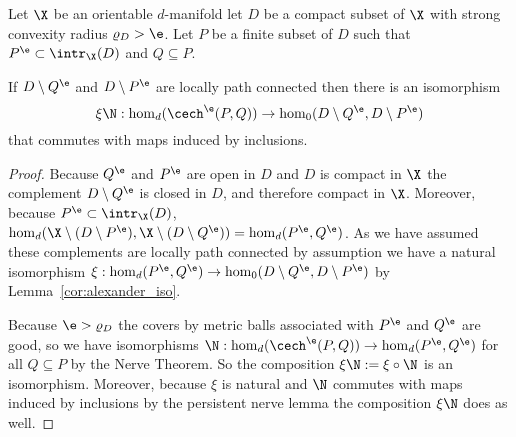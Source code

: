 \begin{lemma}\label{lem:duality_apply}
  Let $\X$ be an orientable $d$-manifold let $D$ be a compact subset of $\X$ with strong convexity radius $\varrho_D > \e$.
  Let $P$ be a finite subset of $D$ such that $P^\e\subset \intr_\X(D)$ and $Q\subseteq P$.

  If $D\setminus Q^\e$ and $D\setminus P^\e$ are locally path connected then there is an isomorphism
  \[ \xi\N : \hom_d(\cech^\e(P,Q))\to \hom_0(D\setminus Q^\e, D\setminus P^\e)\]
  that commutes with maps induced by inclusions.
\end{lemma}
\begin{proof}
  Because $Q^\e$ and $P^\e$ are open in $D$ and $D$ is compact in $\X$ the complement $D\setminus Q^\e$ is closed in $D$, and therefore compact in $\X$.
  Moreover, because $P^\e\subset \intr_\X(D)$, $\hom_d(\X\setminus(D\setminus P^\e), \X\setminus(D\setminus Q^\e)) = \hom_d(P^\e, Q^\e)$.
  As we have assumed these complements are locally path connected by assumption we have a natural isomorphism $\xi : \hom_d(P^\e, Q^\e)\to \hom_0(D\setminus Q^\e, D\setminus P^\e)$
  by Lemma~\ref{cor:alexander_iso}.

  Because $\e > \varrho_D$ the covers by metric balls associated with $P^\e$ and $Q^\e$ are good, so we have isomorphisms $\N : \hom_d(\cech^\e(P, Q))\to \hom_d(P^\e, Q^\e)$ for all $Q\subseteq P$ by the Nerve Theorem.
  So the composition $\xi\N := \xi\circ\N$ is an isomorphism.
  Moreover, because $\xi$ is natural and $\N$ commutes with maps induced by inclusions by the persistent nerve lemma the composition $\xi\N$ does as well.
\end{proof}



